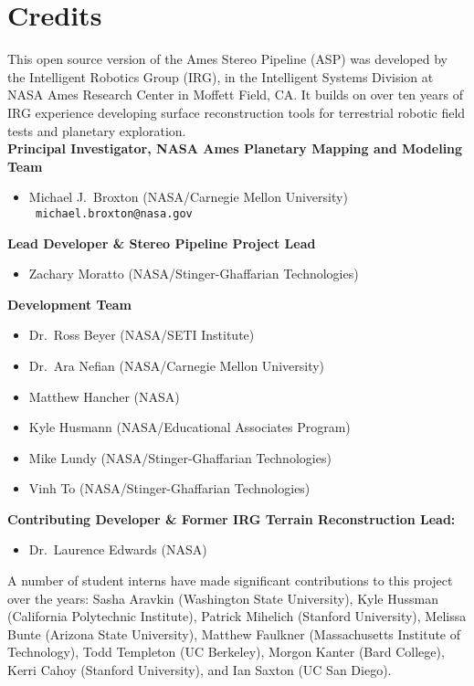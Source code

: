 
\chapter*{Credits}

This open source version of the Ames Stereo Pipeline (ASP) was
developed by the Intelligent Robotics Group (IRG), in the Intelligent
Systems Division at NASA Ames Research Center in Moffett Field, CA. It
builds on over ten years of IRG experience developing surface
reconstruction tools for terrestrial robotic field tests and planetary
exploration. \\

{\bf Principal Investigator, NASA Ames Planetary Mapping and Modeling Team}
\begin {itemize} 
\item Michael J.~Broxton (NASA/Carnegie Mellon University)\\ {\tt
  michael.broxton@nasa.gov}\\
\end{itemize}

{\bf Lead Developer \& Stereo Pipeline Project Lead}
\begin {itemize} 
\item Zachary Moratto (NASA/Stinger-Ghaffarian Technologies)
\end{itemize}

{\bf Development Team}
\begin{itemize}
\item Dr.~Ross Beyer (NASA/SETI Institute)
\item Dr.~Ara Nefian (NASA/Carnegie Mellon University)
\item Matthew Hancher (NASA)
\item Kyle Husmann (NASA/Educational Associates Program)
\item Mike Lundy (NASA/Stinger-Ghaffarian Technologies)
\item Vinh To (NASA/Stinger-Ghaffarian Technologies)
\end{itemize}

{\bf Contributing Developer \& Former IRG Terrain Reconstruction Lead:}
\begin{itemize}
\item Dr.\ Laurence Edwards (NASA)
\end{itemize}

A number of student interns have made significant contributions to
this project over the years: Sasha Aravkin (Washington State
University), Kyle Hussman (California Polytechnic Institute), Patrick
Mihelich (Stanford University), Melissa Bunte (Arizona State
University), Matthew Faulkner (Massachusetts Institute of Technology),
Todd Templeton (UC Berkeley), Morgon Kanter (Bard College), Kerri
Cahoy (Stanford University), and Ian Saxton (UC San Diego).

